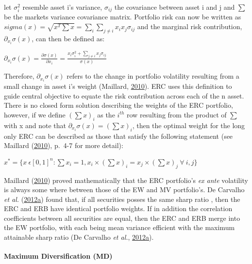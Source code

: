 \documentclass[11pt,preprint, authoryear]{elsarticle}
\numberwithin{equation}{section}
\numberwithin{figure}{section}
\numberwithin{table}{section}
\begin{document}
let \(\sigma_i^2\) resemble asset i's variance, \(\sigma_{ij}\) the
covariance between asset i and j and \(\sum\) be the markets variance
covariance matrix. Portfolio risk can now be written as
\(sigma(x)=\sqrt{x^T\sum x}=\sum_i\sum_{j\neq i}x_ix_j\sigma_{ij}\) and
the marginal risk contribution, \(\partial_{x_i}\sigma(x)\), can then be
defined as:

\begin{center}
$\partial_{x_i}\sigma(x)=\frac{\partial\sigma(x)}{\partial x_i}=\frac{x_i\sigma_i^2+\sum_{j\neq i}x_j\sigma_{ij}}{\sigma(x)}$ 
\end{center}

Therefore, \(\partial_{x_i}\sigma(x)\) refers to the change in portfolio
volatility resulting from a small change in asset i's weight (Maillard,
\protect\hyperlink{ref-maillard2010}{2010}). ERC uses this definition to
guide central objective to equate the risk contribution across each of
the n asset. There is no closed form solution describing the weights of
the ERC portfolio, however, if we define \((\sum x)_i\) as the
\(i^{th}\) row resulting from the product of \(\sum\) with x and note
that \(\partial_{x_i}\sigma(x)=(\sum x)_i\), then the optimal weight for
the long only ERC can be described as those that satisfy the following
statement (see Maillard (\protect\hyperlink{ref-maillard2010}{2010}),
p.~4-7 for more detail):

\begin{center}
$x^*=\{x \ \epsilon[0,1]^n:\sum x_i=1, x_i \times (\sum x)_i=x_j \times (\sum x)_j \ \forall  \ i,j \}$ 
\end{center}

Maillard (\protect\hyperlink{ref-maillard2010}{2010}) proved
mathematically that the ERC portfolio's \emph{ex ante} volatility is
always some where between those of the EW and MV portfolio's. De
Carvalho \emph{et al.}
(\protect\hyperlink{ref-leote}{2012}\protect\hyperlink{ref-leote}{a})
found that, if all securities posses the same sharp ratio , then the ERC
and ERB have identical portfolio weights. If in addition the correlation
coefficients between all securities are equal, then the ERC and ERB
merge into the EW portfolio, with each being mean variance efficient
with the maximum attainable sharp ratio (De Carvalho \emph{et al.},
\protect\hyperlink{ref-leote}{2012}\protect\hyperlink{ref-leote}{a}).

\hypertarget{maximum-diversification-md}{%
\paragraph{Maximum Diversification
(MD)}\label{maximum-diversification-md}}
\end{document}
